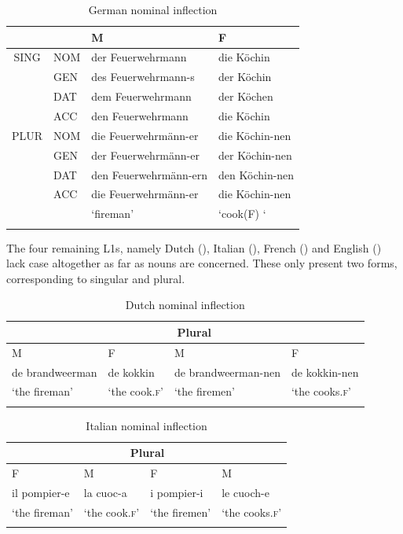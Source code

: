 \begin{table}
    \begin{tabularx}{\textwidth}{lXll}
    \lsptoprule
        \multicolumn{1}{c}{} &  & M & F\\
    \midrule
        \multicolumn{1}{c}{SING} & NOM & der Feuerwehrmann & die Köchin\\
        & GEN & des Feuerwehrmann-s & der Köchin\\
         & DAT & dem Feuerwehrmann & der Köchen\\
         & ACC & den Feuerwehrmann & die Köchin\\
         \midrule
        \multicolumn{1}{c}{PLUR} & NOM & die Feuerwehrmänn-er & die Köchin-nen\\
        & GEN & der Feuerwehrmänn-er & der Köchin-nen\\
         & DAT & den Feuerwehrmänn-ern & den Köchin-nen\\
         & ACC & die Feuerwehrmänn-er & die Köchin-nen\\
        \multicolumn{1}{c}{} &  & ‘fireman’ & ‘cook(F) ‘\\
\lspbottomrule
    \end{tabularx}
    \caption{German nominal inflection}
    \label{tab:02:4a}
\end{table}

The four remaining L1s, namely Dutch (), Italian (), French () and English () lack case altogether as far as nouns are concerned. These only present two forms, corresponding to singular and plural.

\begin{table}
    \begin{tabularx}{\textwidth}{lXll}
    \lsptoprule
        \multicolumn{2}{c}{Singular} & \multicolumn{2}{c}{Plural}\\
    \midrule
        M & F & M & F\\
        \midrule
        de brandweerman & de kokkin & de brandweerman-nen & de kokkin-nen\\
        ‘the fireman’ & ‘the cook.\textsc{f}’ & ‘the firemen’ & ‘the cooks.\textsc{f}’\\
\lspbottomrule
    \end{tabularx}
    \caption{Dutch nominal inflection}
    \label{tab:02:3b}
\end{table}

\begin{table}
    \begin{tabularx}{\textwidth}{XX@{\hspace{1cm}}Xl}
    \lsptoprule
        \multicolumn{2}{c}{Singular} & \multicolumn{2}{c}{Plural}\\
    \midrule
        F & M & F & M\\
        \midrule
        il pompier-e & la cuoc-a & i pompier-i & le cuoch-e \\
        ‘the fireman’ & ‘the cook.\textsc{f}’ & ‘the firemen’ & ‘the cooks.\textsc{f}’\\
\lspbottomrule
    \end{tabularx}
    \caption{Italian nominal inflection}
    \label{tab:02:4b}
\end{table}

